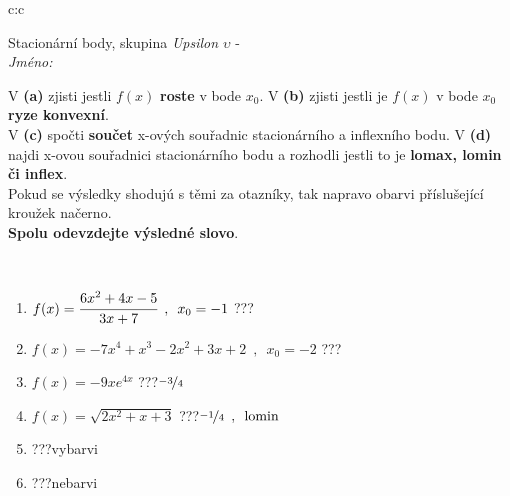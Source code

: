 \documentclass[10pt]{report}
\begin{document}
\newpage
\thispagestyle{empty}
\begin{tabular}{c:c}
\begin{minipage}[c][104.5mm][t]{0.5\linewidth}
\begin{center}
\vspace{7mm}
{\huge Stacionární body, skupina \textit{Upsilon $\upsilon$} -}\\[5mm]
\textit{Jméno:}\phantom{xxxxxxxxxxxxxxxxxxxxxxxxxxxxxxxxxxxxxxxxxxxxxxxxxxxxxxxxxxxxxxxxx}\\[5mm]
\begin{minipage}{0.95\linewidth}
\begin{center}
{\small V \textbf{(a)} zjisti jestli $f(x)$ \textbf{roste} v bode $x_0$. V \textbf{(b)} zjisti jestli je $f(x)$ v bode $x_0$ \textbf{ryze konvexní}.\\V \textbf{(c)} spočti \textbf{součet} x-ových souřadnic stacionárního a inflexního bodu. V \textbf{(d)} najdi x-ovou souřadnici stacionárního bodu a rozhodli jestli to je \textbf{lomax, lomin či inflex}.\\Pokud se výsledky shodujú s těmi za otazníky, tak napravo obarvi příslušející kroužek načerno.\\\textbf{Spolu odevzdejte výsledné slovo}}.
\end{center}
\end{minipage}
\\[1mm]
\begin{minipage}{0.79\linewidth}
\begin{center}
\begin{varwidth}{\linewidth}
\begin{enumerate}
\normalsize
\item $f(x)=\cfrac{6x^2+4x-5}{3x+7}\enspace , \enspace x_0=-1$\quad \dotfill\; ???\;\dotfill \quad {}
\item $f(x)=-7x^4+x^3-2x^2+3x+2\enspace , \enspace x_0=-2$\quad \dotfill\; ???\;\dotfill \quad {}
\item $f(x)=-9xe^{4x}$\quad \dotfill\; ???\;\dotfill \quad $\nicefrac{-3}{4}$
\item $f(x)=\sqrt{2x^2+x+3}$\quad \dotfill\; ???\;\dotfill \quad $\nicefrac{-1}{4}\enspace , \enspace \mathrm{lomin}$
\item \quad \dotfill\; ???\;\dotfill \quad vybarvi
\item \quad \dotfill\; ???\;\dotfill \quad nebarvi
\end{enumerate}
\end{varwidth}
\end{center}

\end{minipage}
\end{center}
\end{minipage}
\end{tabular}
\end{document}
